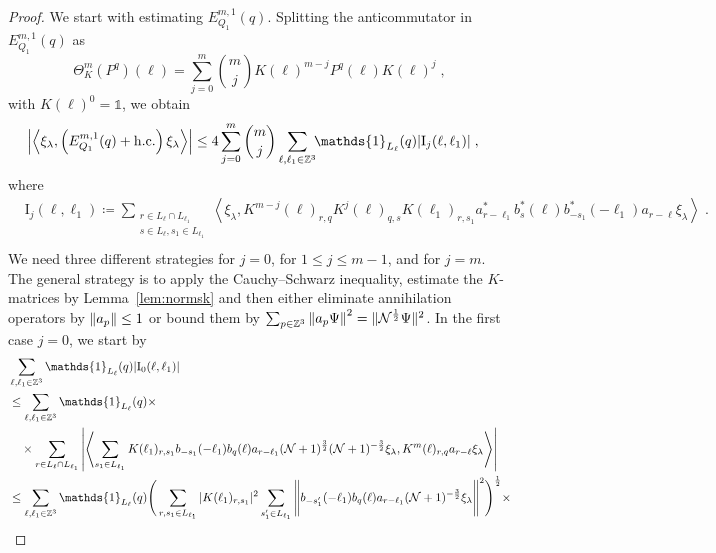 \documentclass[12pt,a4paper]{article}
\numberwithin{equation}{section}
\newcommand{\cN}{\mathcal{N}}
\newcommand{\1}{\mathbb{I}}
\newcommand{\I}{\mathrm{I}}
\newcommand{\Zstar}{\mathbb{Z}^3} %
\newcommand{\Z}{\mathbb{Z}}
\newcommand{\NN}{\mathcal{N}}
\newcommand{\half}{\frac{1}{2}}
\newcommand{\eva}[1]{\left\langle #1 \right\rangle}
\theoremstyle{plain}
\theoremstyle{definition}
\theoremstyle{remark}
\theoremstyle{plain}
\theoremstyle{definition}
\theoremstyle{remark}
\begin{document}
\begin{proof}
We start with estimating $ E^{m,1}_{Q_1}(q) $. Splitting the anticommutator in $ E^{m,1}_{Q_1}(q) $ as
\begin{equation} \label{eq:q-q}
	\Theta^m_K(P^q)(\ell)
	= \sum_{j=0}^m {{m}\choose j} K(\ell)^{m-j} P^q(\ell) K(\ell)^{j} \;,
\end{equation}
with $ K(\ell)^0 = \mathds{1} $, we obtain
\begin{equation} \label{eq:EQ1111}
\begin{aligned}
	& \abs{\eva{\xi_\lambda,\left(E^{m,1}_{Q_1}(q) +  \mathrm{h.c.}\right) \xi_\lambda }}
	\le 4 \sum_{j=0}^m {{m}\choose j} \sum_{\ell,\ell_1  \in \Zstar}\!\! \mathds{1}_{L_\ell}(q) | \I_j(\ell, \ell_1)| \;,
	\end{aligned}
\end{equation}
where
\begin{equation}
\begin{aligned}
& 	\I_j(\ell, \ell_1)
	\coloneq \sum_{\substack{r\in L_{\ell} \cap L_{\ell_1}\\ s \in L_{\ell},s_1\in L_{\ell_1}}}
		\eva{\xi_\lambda, K^{m-j}(\ell)_{r,q} K^{j}(\ell)_{q,s} K(\ell_1)_{r,s_1} a^*_{r-\ell_1} b^*_{s}(\ell) b^*_{-s_1}(-\ell_1) a_{r-\ell} \xi_\lambda} \;. \\
\end{aligned}
\end{equation}
We need three different strategies for $ j = 0 $, for $ 1 \le j \le m-1 $, and for $ j = m $. The general strategy is to apply the Cauchy--Schwarz inequality, estimate the $ K $-matrices by Lemma~\ref{lem:normsk} and then either eliminate annihilation operators by $ \norm{a_p} \le 1 $ or bound them by $ \sum_{p \in \Z^3} \norm{a_p \Psi}^2 = \Vert \cN^{\half} \Psi \Vert^2 $. In the first case $ j = 0 $, we start by
\begin{align}
	&\sum_{\ell,\ell_1 \in \Zstar} \mathds{1}_{L_\ell}(q) |\I_0(\ell, \ell_1)| \nonumber\\
	&\le \sum_{\ell,\ell_1 \in \Zstar} \mathds{1}_{L_\ell}(q) \times \nonumber\\
	&\quad \times \sum\limits_{r \in L_\ell \cap L_{\ell_1}} \abs{\eva{ \sum\limits_{s_1 \in L_{\ell_1}} K(\ell_1)_{r,s_1} b_{-s_1}(-\ell_1) b_{q}(\ell) a_{r-\ell_1} (\NN+1)^{\frac 32} (\NN+1)^{-\frac 32} \xi_\lambda, K^{m}(\ell)_{r,q} a_{r-\ell} \xi_\lambda }}\nonumber\\
	&\leq \sum_{\ell,\ell_1 \in \Zstar} \mathds{1}_{L_\ell}(q) \Bigg( \sum_{r,s_1 \in L_{\ell_1}} |K(\ell_1)_{r,s_1}|^2
		\sum_{s_1' \in L_{\ell_1}} \Bigg\Vert b_{-s_1'}(-\ell_1) b_{q}(\ell) a_{r-\ell_1} (\NN+1)^{-\frac 32}\xi_\lambda \Bigg\Vert^2\Bigg)^\half \times\nonumber\\

\end{align}
\end{proof}
\end{document}
